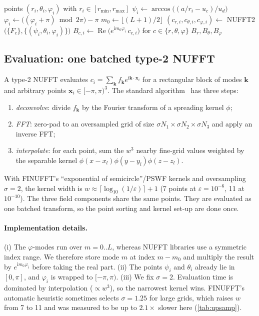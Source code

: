 \documentclass[11pt,a4paper]{article}
\theoremstyle{remark}
\newcommand{\eps}{\varepsilon}
\renewcommand{\Re}{\operatorname{Re}}
\begin{document}
\begin{algorithm}[t]
\caption{Evaluation at $M$ scattered points}\label{alg:eval}
\begin{algorithmic}[1]
\Require points $(r_i,\theta_i,\varphi_i)$ with $r_i\in[r_{\min},r_{\max}]$
\State $\psi_i\gets\arccos\big((a/r_i-u_c)/u_d\big)$ 
\State $\varphi_i\gets\big((\varphi_i+\pi)\bmod2\pi\big)-\pi$ \Comment{NUFFT domain $[-\pi,\pi)$}
\State $m_0\gets\lfloor(L+1)/2\rfloor$ 
\State $(c_{r,i},c_{\theta,i},c_{\varphi,i})\gets$ NUFFT2$\big(\{F_c\},\{(\psi_i,\theta_i,\varphi_i)\}\big)$ 
\State $B_{c,i}\gets\Re\big(e^{\mathrm im_0\varphi_i}\,c_{c,i}\big)$ for $c\in\{r,\theta,\varphi\}$
\State \Return $B_{r},B_\theta,B_\varphi$
\end{algorithmic}
\end{algorithm}

\subsection{Evaluation: one batched type-2 NUFFT}

A type-2 NUFFT evaluates $c_i=\sum_{\mathbf k}f_{\mathbf k}e^{\mathrm i\mathbf k\cdot\mathbf x_i}$
for a rectangular block of modes $\mathbf k$ and arbitrary points $\mathbf x_i\in[-\pi,\pi)^3$. The
standard algorithm~\cite{dutt1993,greengard2004,barnett2019} has three steps:
\begin{enumerate}
\item \emph{deconvolve}: divide $f_{\mathbf k}$ by the Fourier transform of a spreading kernel $\phi$;
\item \emph{FFT}: zero-pad to an oversampled grid of size $\sigma N_1\times\sigma N_2\times\sigma N_3$ and apply an inverse FFT;
\item \emph{interpolate}: for each point, sum the $w^3$ nearby fine-grid values weighted by the
  separable kernel $\phi(x-x_l)\phi(y-y_l)\phi(z-z_l)$.
\end{enumerate}
With FINUFFT's ``exponential of semicircle''/PSWF kernels and oversampling $\sigma=2$, the kernel
width is $w\approx\lceil\log_{10}(1/\eps)\rceil+1$ (7 points at $\eps=10^{-6}$, 11 at
$10^{-10}$). The three field components share the same points. They are evaluated as one
batched transform, so the point sorting and kernel set-up are done once.

\paragraph{Implementation details.}
(i) The $\varphi$-modes run over $m=0..L$, whereas NUFFT libraries use a symmetric index range.
We therefore store mode $m$ at index $m-m_0$ and multiply the result by $e^{\mathrm im_0\varphi_i}$
before taking the real part. (ii) The points $\psi_i$ and $\theta_i$ already lie in $[0,\pi]$, and
$\varphi_i$ is wrapped to $[-\pi,\pi)$. (iii) We fix $\sigma=2$. Evaluation time is dominated by
interpolation ($\propto w^3$), so the narrowest kernel wins. FINUFFT's automatic heuristic sometimes
selects $\sigma=1.25$ for large grids, which raises $w$ from 7 to 11 and was measured to be up to
$2.1\times$ slower here (\cref{tab:upsamp}).
\end{document}
